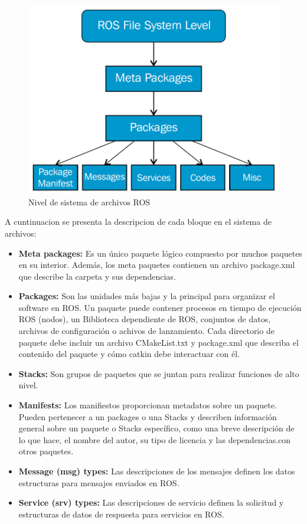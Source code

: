                 
            \begin{figure}[htb]
                \centering
                \includegraphics[width=0.55\linewidth]{Main/Chapter3/Images3/n_s_a_2.png}
                \caption{Nivel de sistema de archivos ROS \cite{lentin_2015}}
                \label{f:Cap3_conceptos_2}
            \end{figure} 
                
                

            A cuntinuacion se presenta la descripcion de cada bloque en el sistema de archivos:
            \begin{itemize}
                \item {\textbf{Meta packages:} Es un único paquete lógico compuesto por muchos paquetes en su interior. Además, los meta paquetes contienen un archivo package.xml que describe la carpeta y sus dependencias.}
                \item {\textbf{Packages:} Son las unidades más bajas y la principal para organizar el software en ROS. Un paquete puede contener procesos en tiempo de ejecución ROS (nodos), un Biblioteca dependiente de ROS, conjuntos de datos, archivos de configuración o achivos de lanzamiento. Cada directorio de paquete debe incluir un archivo CMakeList.txt y package.xml que describa el contenido del paquete y cómo catkin debe interactuar con él.}
                \item {\textbf{Stacks:} Son grupos de paquetes que se juntan para realizar funciones de alto nivel.}
                \item {\textbf{Manifests:} Los manifiestos proporcionan metadatos sobre un paquete. Pueden pertenecer a un packages o una Stacks y describen información general sobre un paquete o Stacks específico, como una breve descripción de lo que hace, el nombre del autor, su tipo de licencia y las dependencias.con otros paquetes.}
                \item {\textbf{Message (msg) types:} Las descripciones de los mensajes definen los datos estructuras para mensajes enviados en ROS.}
                \item {\textbf{Service (srv) types:} Las descripciones de servicio definen la solicitud y estructuras de datos de respuesta para servicios en ROS.}
            \end{itemize}
            
